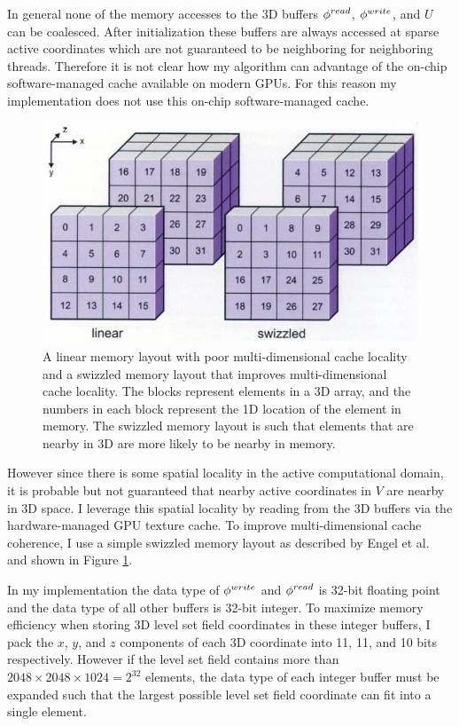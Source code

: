 In general none of the memory accesses to the 3D buffers $\phi^{read}$, $\phi^{write}$, and $U$ can be coalesced. After initialization these buffers are always accessed at sparse active coordinates which are not guaranteed to be neighboring for neighboring threads. Therefore it is not clear how my algorithm can advantage of the on-chip software-managed cache available on modern GPUs. For this reason my implementation does not use this on-chip software-managed cache.

\begin{figure}[t]
\centering
\includegraphics[width=6.0in]{figures/swizzled.jpg}
\caption{A linear memory layout with poor multi-dimensional cache locality and a swizzled memory layout that improves multi-dimensional cache locality. The blocks represent elements in a 3D array, and the numbers in each block represent the 1D location of the element in memory. The swizzled memory layout is such that elements that are nearby in 3D are more likely to be nearby in memory.~\cite{Engel-2006}}
\label{fig:swizzled}
\end{figure}

However since there is some spatial locality in the active computational domain, it is probable but not guaranteed that nearby active coordinates in $V$ are nearby in 3D space. I leverage this spatial locality by reading from the 3D buffers via the hardware-managed GPU texture cache. To improve multi-dimensional cache coherence, I use a simple swizzled memory layout as described by Engel et al.~\cite{Engel-2006} and shown in Figure \ref{fig:swizzled}.

In my implementation the data type of $\phi^{write}$ and $\phi^{read}$ is 32-bit floating point and the data type of all other buffers is 32-bit integer. To maximize memory efficiency when storing 3D level set field coordinates in these integer buffers, I pack the $x$, $y$, and $z$ components of each 3D coordinate into 11, 11, and 10 bits respectively. However if the level set field contains more than $2048 \times 2048 \times 1024 = 2^{32}$ elements, the data type of each integer buffer must be expanded such that the largest possible level set field coordinate can fit into a single element.

